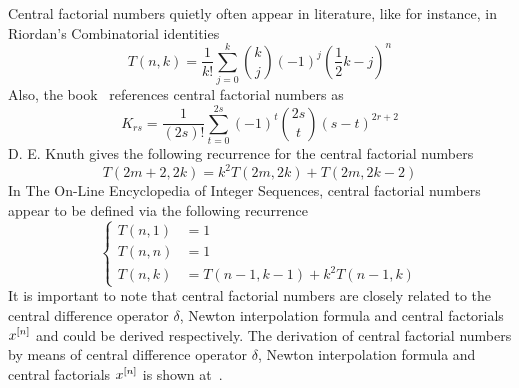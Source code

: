 Central factorial numbers quietly often appear in literature, like for instance, in Riordan's
Combinatorial identities~\cite{riordan1968combinatorial}
\begin{equation*}
    T(n,k) = \frac{1}{k!} \sum_{j=0}^{k} \binom{k}{j} (-1)^{j} \left( \frac{1}{2}k - j \right)^{n}
\end{equation*}
Also, the book~\cite{carlitz_riordan_1963} references central factorial numbers as
\begin{equation*}
    K_{rs} = \frac{1}{(2s)!} \sum_{t=0}^{2s} (-1)^t \binom{2s}{t} (s-t)^{2r+2}
\end{equation*}
D. E. Knuth gives the following recurrence for the central factorial numbers~\cite{knuth1993johann}
\begin{equation*}
    T(2m+2, 2k) = k^2 T(2m,2k) + T(2m, 2k - 2)
\end{equation*}
In The On-Line Encyclopedia of Integer Sequences, central factorial numbers appear to be defined
via the following recurrence
\begin{equation*}
    \begin{cases}
        T(n,1) &=1 \\
        T(n,n) &=1 \\
        T(n,k) &=T(n-1, k-1) + k^2 T(n-1, k)
    \end{cases}
\end{equation*}
It is important to note that central factorial numbers are closely related to the central difference operator $\delta$,
Newton interpolation formula and central factorials $x^{[n]}$ and could be derived respectively.
The derivation of central factorial numbers by means of central difference operator $\delta$,
Newton interpolation formula and central factorials $x^{[n]}$ is shown at~\cite{scheuer2020mathstackexchange}.

